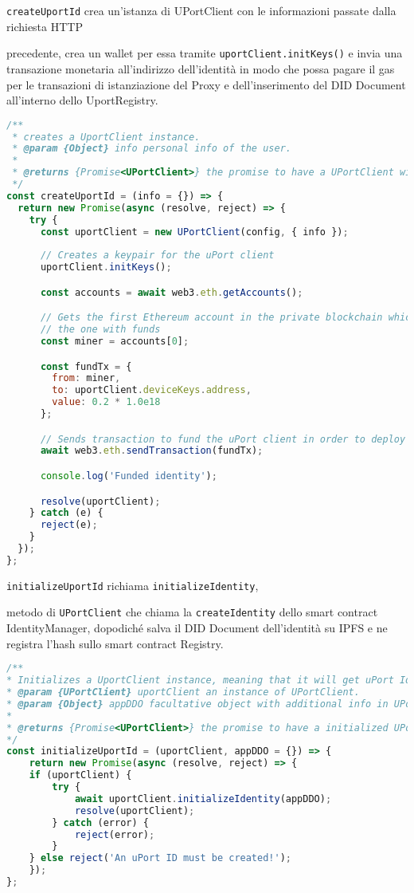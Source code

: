 \texttt{createUportId} crea un'istanza di UPortClient con le informazioni passate dalla richiesta HTTP

precedente, crea un wallet per essa tramite \texttt{uportClient.initKeys()} e invia una transazione
monetaria all'indirizzo dell'identità in modo che possa pagare il gas per le transazioni di istanziazione
del Proxy e dell'inserimento del DID Document all'interno dello UportRegistry.

\begin{lstlisting}[language=JavaScript, numbers=none]
/**
 * creates a UportClient instance.
 * @param {Object} info personal info of the user.
 *
 * @returns {Promise<UPortClient>} the promise to have a UPortClient with specified infos.
 */
const createUportId = (info = {}) => {
  return new Promise(async (resolve, reject) => {
    try {
      const uportClient = new UPortClient(config, { info });
      
      // Creates a keypair for the uPort client
      uportClient.initKeys();

      const accounts = await web3.eth.getAccounts();

      // Gets the first Ethereum account in the private blockchain which is the one who is mining hence
      // the one with funds  
      const miner = accounts[0];

      const fundTx = {
        from: miner,
        to: uportClient.deviceKeys.address,
        value: 0.2 * 1.0e18
      };

      // Sends transaction to fund the uPort client in order to deploy uPort contracts later
      await web3.eth.sendTransaction(fundTx);

      console.log('Funded identity');

      resolve(uportClient);
    } catch (e) {
      reject(e);
    }
  });
};
\end{lstlisting}

\texttt{initializeUportId} richiama \texttt{initializeIdentity}, 

metodo di \texttt{UPortClient} che chiama la \texttt{createIdentity}
dello smart contract IdentityManager, dopodiché salva il DID Document
dell'identità su IPFS e ne registra l'hash sullo smart contract Registry.

\begin{lstlisting}[language=JavaScript, numbers=none]
/**
* Initializes a UportClient instance, meaning that it will get uPort IdentityManager contract, save the DID Document on IPFS and save it on Registry contract.
* @param {UPortClient} uportClient an instance of UPortClient.
* @param {Object} appDDO facultative object with additional info in UPortClient is an instance of a uPort application
*
* @returns {Promise<UPortClient>} the promise to have a initialized UPortClient.
*/
const initializeUportId = (uportClient, appDDO = {}) => {
    return new Promise(async (resolve, reject) => {
    if (uportClient) {
        try {
            await uportClient.initializeIdentity(appDDO);
            resolve(uportClient);
        } catch (error) {
            reject(error);
        }
    } else reject('An uPort ID must be created!');
    });
};
\end{lstlisting}

